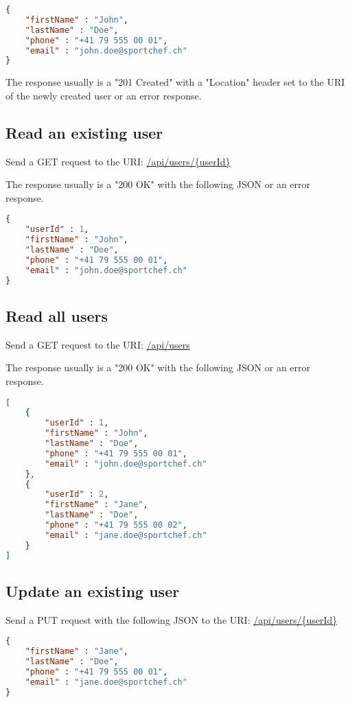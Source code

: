 \documentclass[a4paper,openright,twoside]{report}
\begin{document}
\begin{lstlisting}[language=json]
{
	"firstName" : "John",
	"lastName" : "Doe",
	"phone" : "+41 79 555 00 01",
	"email" : "john.doe@sportchef.ch"
}
\end{lstlisting}

The response usually is a "201 Created" with a "Location" header set to the URI of the newly created user or an error response.

\subsection{Read an existing user}
Send a GET request to the URI: \url{/api/users/{userId}}

The response usually is a "200 OK" with the following JSON or an error response.

\begin{lstlisting}[language=json]
{
	"userId" : 1,
	"firstName" : "John",
	"lastName" : "Doe",
	"phone" : "+41 79 555 00 01",
	"email" : "john.doe@sportchef.ch"
}
\end{lstlisting}

\subsection{Read all users}
Send a GET request to the URI: \url{/api/users}

The response usually is a "200 OK" with the following JSON or an error response.

\begin{lstlisting}[language=json]
[
	{
		"userId" : 1,
		"firstName" : "John",
		"lastName" : "Doe",
		"phone" : "+41 79 555 00 01",
		"email" : "john.doe@sportchef.ch"
	},
	{
		"userId" : 2,
		"firstName" : "Jane",
		"lastName" : "Doe",
		"phone" : "+41 79 555 00 02",
		"email" : "jane.doe@sportchef.ch"
	}
]
\end{lstlisting}

\subsection{Update an existing user}
Send a PUT request with the following JSON to the URI: \url{/api/users/{userId}}

\begin{lstlisting}[language=json]
{
	"firstName" : "Jane",
	"lastName" : "Doe",
	"phone" : "+41 79 555 00 01",
	"email" : "jane.doe@sportchef.ch"
}
\end{lstlisting}
\end{document}
